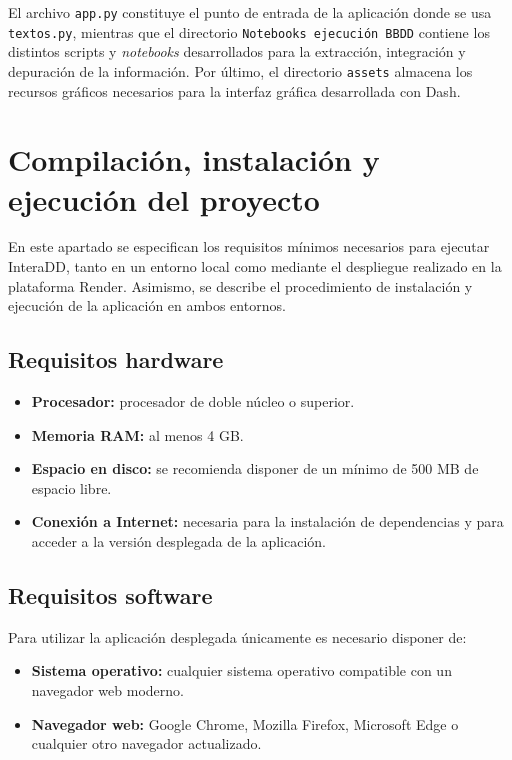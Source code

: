El archivo \texttt{app.py} constituye el punto de entrada de la aplicación donde se usa \texttt{textos.py}, mientras que el directorio \texttt{Notebooks ejecución BBDD} contiene los distintos scripts y \textit{notebooks} desarrollados para la extracción, integración y depuración de la información. Por último, el directorio \texttt{assets} almacena los recursos gráficos necesarios para la interfaz gráfica desarrollada con Dash.

\section{Compilación, instalación y ejecución del proyecto}

En este apartado se especifican los requisitos mínimos necesarios para ejecutar InteraDD, tanto en un entorno local como mediante el despliegue realizado en la plataforma Render. Asimismo, se describe el procedimiento de instalación y ejecución de la aplicación en ambos entornos.

\subsection*{Requisitos hardware}

\begin{itemize}
    \item \textbf{Procesador:} procesador de doble núcleo o superior.
    \item \textbf{Memoria RAM:} al menos 4 GB.
    \item \textbf{Espacio en disco:} se recomienda disponer de un mínimo de 500 MB de espacio libre.
    \item \textbf{Conexión a Internet:} necesaria para la instalación de dependencias y para acceder a la versión desplegada de la aplicación.
\end{itemize}

\subsection*{Requisitos software}

Para utilizar la aplicación desplegada únicamente es necesario disponer de:

\begin{itemize}
    \item \textbf{Sistema operativo:} cualquier sistema operativo compatible con un navegador web moderno.
    \item \textbf{Navegador web:} Google Chrome, Mozilla Firefox, Microsoft Edge o cualquier otro navegador actualizado.
\end{itemize}

